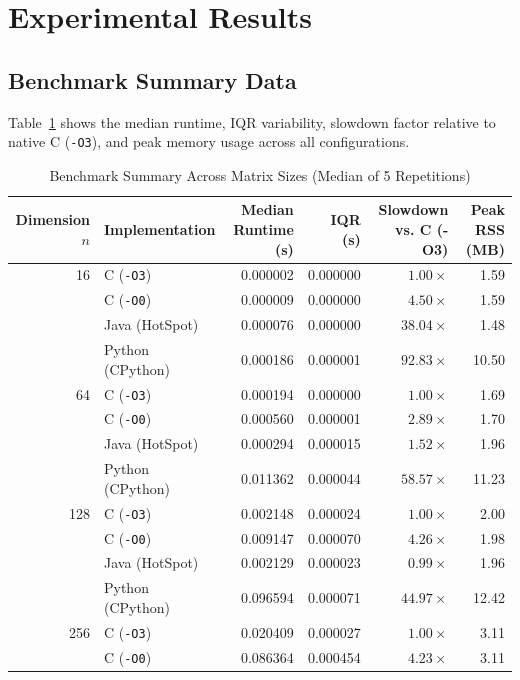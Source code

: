 \documentclass[10pt,conference,a4paper]{IEEEtran}
\begin{document}
\section{Experimental Results}

\subsection{Benchmark Summary Data}
Table~\ref{tab:summary} shows the median runtime, IQR variability, slowdown factor relative to native C (\texttt{-O3}), and peak memory usage across all configurations.

\begin{table}[t]
\centering
\caption{Benchmark Summary Across Matrix Sizes (Median of 5 Repetitions)}
\label{tab:summary}
\begin{tabular}{r l r r r r}
\toprule
\textbf{Dimension $n$} & \textbf{Implementation} & \textbf{Median Runtime (s)} & \textbf{IQR (s)} & \textbf{Slowdown vs. C (-O3)} & \textbf{Peak RSS (MB)} \\
\midrule
16 & C (\texttt{-O3}) & 0.000002 & 0.000000 & $1.00\times$ & 1.59 \\
   & C (\texttt{-O0}) & 0.000009 & 0.000000 & $4.50\times$ & 1.59 \\
   & Java (HotSpot)   & 0.000076 & 0.000000 & $38.04\times$ & 1.48 \\
   & Python (CPython) & 0.000186 & 0.000001 & $92.83\times$ & 10.50 \\
\midrule
64 & C (\texttt{-O3}) & 0.000194 & 0.000000 & $1.00\times$ & 1.69 \\
   & C (\texttt{-O0}) & 0.000560 & 0.000001 & $2.89\times$ & 1.70 \\
   & Java (HotSpot)   & 0.000294 & 0.000015 & $1.52\times$ & 1.96 \\
   & Python (CPython) & 0.011362 & 0.000044 & $58.57\times$ & 11.23 \\
\midrule
128 & C (\texttt{-O3}) & 0.002148 & 0.000024 & $1.00\times$ & 2.00 \\
    & C (\texttt{-O0}) & 0.009147 & 0.000070 & $4.26\times$ & 1.98 \\
    & Java (HotSpot)   & 0.002129 & 0.000023 & $0.99\times$ & 1.96 \\
    & Python (CPython) & 0.096594 & 0.000071 & $44.97\times$ & 12.42 \\
\midrule
256 & C (\texttt{-O3}) & 0.020409 & 0.000027 & $1.00\times$ & 3.11 \\
    & C (\texttt{-O0}) & 0.086364 & 0.000454 & $4.23\times$ & 3.11 \\

\end{tabular}
\end{table}
\end{document}
